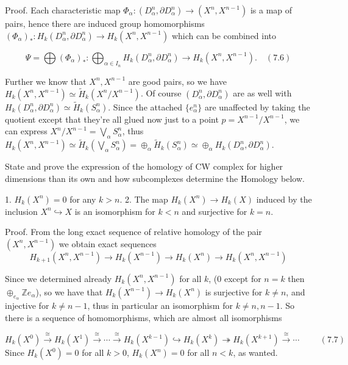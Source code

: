 Proof. 
Each characteristic map \(\Phi_\alpha : (D^n_\alpha, \partial D^n_\alpha) \to (X^n, X^{n-1})\) is a map of pairs, 
hence there are induced group homomorphisms \((\Phi_\alpha)_* : H_k(D^n_\alpha, \partial D^n_\alpha) \to H_k(X^n, X^{n-1})\) which can be combined into

\[
\Psi = \bigoplus (\Phi_\alpha)_* : \bigoplus_{\alpha \in I_n} H_k(D^n_\alpha, \partial D^n_\alpha) \longrightarrow H_k(X^n, X^{n-1}). 
\quad (7.6)
\]

Further we know that \( X^n, X^{n-1} \) are good pairs, so we have \( H_k(X^n, X^{n-1}) \simeq \tilde{H}_k(X^n / X^{n-1}) \).
Of course \((D^n_\alpha, \partial D^n_\alpha)\) are as well with \( H_k(D^n_\alpha, \partial D^n_\alpha) \simeq \tilde{H}_k(S^n_\alpha) \).
Since the attached \( \{e^n_\alpha\} \) are unaffected by taking the quotient except that they're all glued now just to a point \( p = X^{n-1}/X^{n-1} \),
we can express \( X^n/X^{n-1} = \bigvee_\alpha S^n_\alpha \), thus
\( H_k(X^n, X^{n-1}) \simeq \tilde{H}_k(\bigvee_\alpha S^n_\alpha) = \oplus_\alpha \tilde{H}_k(S^n_\alpha) \simeq \oplus_\alpha H_k(D^n_\alpha, \partial D^n_\alpha) \).


State and prove the expression of the homology of CW complex for higher dimensions than its own and how subcomplexes 
determine the Homology below.

1. \(H_k(X^n) = 0\) for any \(k > n\).
2. The map \(H_k(X^n) \to H_k(X)\) induced by the inclusion \(X^n \hookrightarrow X\) is an isomorphism for \(k < n\) and surjective for \(k = n\). 

Proof. 
From the long exact sequence of relative homology of the pair \((X^n, X^{n-1})\) we obtain exact sequences 
\[
H_{k+1}(X^n, X^{n-1}) \to H_k(X^{n-1}) \to H_k(X^n) \to H_k(X^n, X^{n-1})
\]

Since we determined already \(H_{k}(X^n, X^{n-1})\) for all \( k \), (\( 0 \) except for \( n = k \) then \( \oplus_{e_\alpha} \mathbb{Z}e_\alpha \)), so
we have that \(H_k(X^{n-1}) \rightarrow H_k(X^n)\) is surjective for \(k \neq n\), and injective for \(k \neq n-1\), thus in particular an isomorphism for 
\(k \neq n, n-1\). So there is a sequence of homomorphisms, which are almost all isomorphisms

\( H_k(X^0) \xrightarrow{\cong} H_k(X^1) \xrightarrow{\cong} \dotsb \xrightarrow{\cong} H_k(X^{k-1}) \hookrightarrow H_k(X^k) \twoheadrightarrow H_k(X^{k+1}) \xrightarrow{\cong} \dotsb \hspace{1cm} (7.7) \)
Since \(H_k(X^0) = 0\) for all \(k > 0\), \(H_k(X^n) = 0\) for all \(n < k\), as wanted.

